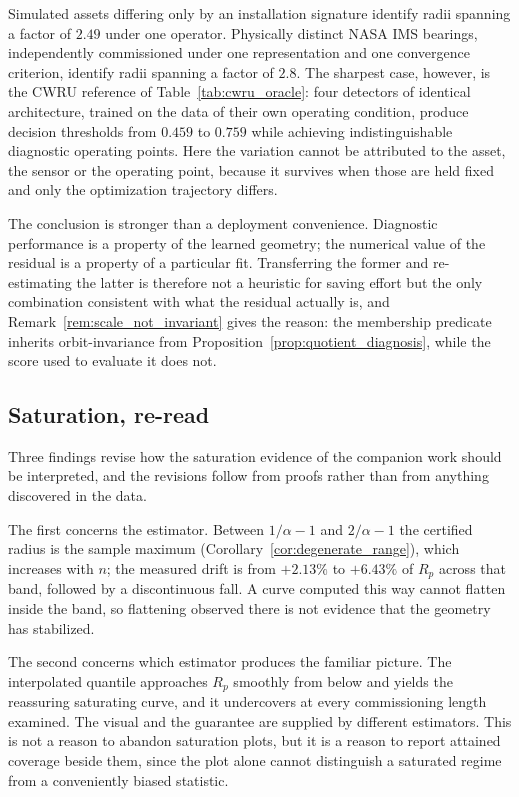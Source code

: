 \documentclass[a4paper]{cas-sc}
\begin{document}
Simulated assets differing only by an installation signature identify radii
spanning a factor of \(2.49\) under one operator. Physically distinct NASA IMS
bearings, independently commissioned under one representation and one
convergence criterion, identify radii spanning a factor of \(2.8\). The
sharpest case, however, is the CWRU reference of
Table~\ref{tab:cwru_oracle}: four detectors of identical architecture, trained
on the data of their own operating condition, produce decision thresholds from
\(0.459\) to \(0.759\) while achieving indistinguishable diagnostic operating
points. Here the variation cannot be attributed to the asset, the sensor or
the operating point, because it survives when those are held fixed and only
the optimization trajectory differs.

The conclusion is stronger than a deployment convenience. Diagnostic
performance is a property of the learned geometry; the numerical value of the
residual is a property of a particular fit. Transferring the former and
re-estimating the latter is therefore not a heuristic for saving effort but
the only combination consistent with what the residual actually is, and
Remark~\ref{rem:scale_not_invariant} gives the reason: the membership
predicate inherits orbit-invariance from
Proposition~\ref{prop:quotient_diagnosis}, while the score used to evaluate it
does not.

\subsection{Saturation, re-read}
\label{subsec:disc_saturation}

Three findings revise how the saturation evidence of the companion work
\citep{disanti2026inverse} should be interpreted, and the revisions follow
from proofs rather than from anything discovered in the data.

The first concerns the estimator. Between \(1/\alpha-1\) and \(2/\alpha-1\)
the certified radius is the sample maximum
(Corollary~\ref{cor:degenerate_range}), which increases with \(n\); the
measured drift is from \(+2.13\%\) to \(+6.43\%\) of \(R_p\) across that band,
followed by a discontinuous fall. A curve computed this way cannot flatten
inside the band, so flattening observed there is not evidence that the
geometry has stabilized.

The second concerns which estimator produces the familiar picture. The
interpolated quantile approaches \(R_p\) smoothly from below and yields the
reassuring saturating curve, and it undercovers at every commissioning length
examined. The visual and the guarantee are supplied by different estimators.
This is not a reason to abandon saturation plots, but it is a reason to report
attained coverage beside them, since the plot alone cannot distinguish a
saturated regime from a conveniently biased statistic.
\end{document}
